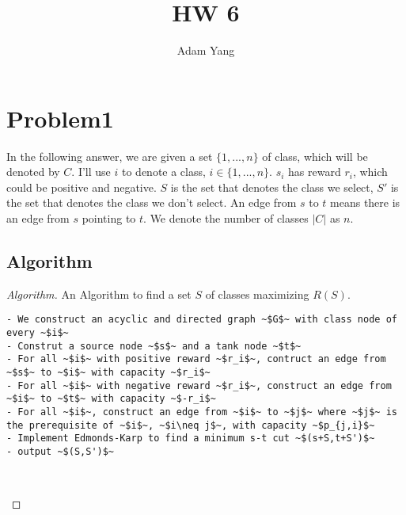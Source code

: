 \documentclass[openany]{article}
\begin{document}
\title{HW 6}
\author{Adam Yang}
\maketitle




\section*{Problem1}
In the following answer, we are given a set $\{1,...,n\}$ of class, which will be denoted by $C$. I'll use $i$ to denote a class, $i \in \{1,...,n\}$. $s_i$ has reward $r_i$, which could be positive and negative. $S$ is the set that denotes the class we select, $S'$ is the set that denotes the class we don't select. An edge from $s$ to $t$ means there is an edge from $s$ pointing to $t$. We denote the number of classes $|C|$ as $n$.

\subsection*{Algorithm}
\begin{proof}[Algorithm]{}
		\renewcommand{\qedsymbol}{}
		An Algorithm to find a set $S$ of classes maximizing $R(S)$.
		\begin{lstlisting}[basicstyle=\fontsize{8}{9}\selectfont\ttfamily]
- We construct an acyclic and directed graph ~$G$~ with class node of every ~$i$~
- Construt a source node ~$s$~ and a tank node ~$t$~
- For all ~$i$~ with positive reward ~$r_i$~, contruct an edge from ~$s$~ to ~$i$~ with capacity ~$r_i$~
- For all ~$i$~ with negative reward ~$r_i$~, construct an edge from ~$i$~ to ~$t$~ with capacity ~$-r_i$~
- For all ~$i$~, construct an edge from ~$i$~ to ~$j$~ where ~$j$~ is the prerequisite of ~$i$~, ~$i\neq j$~, with capacity ~$p_{j,i}$~
- Implement Edmonds-Karp to find a minimum s-t cut ~$(s+S,t+S')$~
- output ~$(S,S')$~

        
		\end{lstlisting} 
\end{proof}
\end{document}
